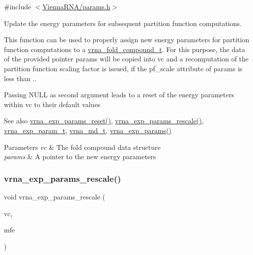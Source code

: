 {\ttfamily \#include $<$\mbox{\hyperlink{params_8h}{Vienna\+R\+N\+A/params.\+h}}$>$}



Update the energy parameters for subsequent partition function computations. 

This function can be used to properly assign new energy parameters for partition function computations to a \mbox{\hyperlink{group__fold__compound_ga1b0cef17fd40466cef5968eaeeff6166}{vrna\+\_\+fold\+\_\+compound\+\_\+t}}. For this purpose, the data of the provided pointer {\ttfamily params} will be copied into {\ttfamily vc} and a recomputation of the partition function scaling factor is issued, if the {\ttfamily pf\+\_\+scale} attribute of {\ttfamily params} is less than {.}.

Passing N\+U\+LL as second argument leads to a reset of the energy parameters within vc to their default values

\begin{DoxySeeAlso}{See also}
\mbox{\hyperlink{group__energy__parameters_gaa5409218068be84d7b50c78fbdaa85a9}{vrna\+\_\+exp\+\_\+params\+\_\+reset()}}, \mbox{\hyperlink{group__energy__parameters_gad607bc3a5b5da16400e2ca4ea5560233}{vrna\+\_\+exp\+\_\+params\+\_\+rescale()}}, \mbox{\hyperlink{group__energy__parameters_ga01d8b92fe734df8d79a6169482c7d8d8}{vrna\+\_\+exp\+\_\+param\+\_\+t}}, \mbox{\hyperlink{group__model__details_ga1f8a10e12a0a1915f2a4eff0b28ea17c}{vrna\+\_\+md\+\_\+t}}, \mbox{\hyperlink{group__energy__parameters_gab1f3016f96aa96bff020cdd904605afa}{vrna\+\_\+exp\+\_\+params()}}
\end{DoxySeeAlso}

\begin{DoxyParams}{Parameters}
{\em vc} & The fold compound data structure \\
\hline
{\em params} & A pointer to the new energy parameters \\
\hline
\end{DoxyParams}
\mbox{\label{group__energy__parameters_gad607bc3a5b5da16400e2ca4ea5560233}} 
\subsubsection{\texorpdfstring{vrna\+\_\+exp\+\_\+params\+\_\+rescale()}{vrna\_exp\_params\_rescale()}}
{\footnotesize\ttfamily void vrna\+\_\+exp\+\_\+params\+\_\+rescale (\begin{DoxyParamCaption}\item[{\mbox{\hyperlink{group__fold__compound_ga1b0cef17fd40466cef5968eaeeff6166}{vrna\+\_\+fold\+\_\+compound\+\_\+t}} $\ast$}]{vc,  }\item[{double $\ast$}]{mfe }\end{DoxyParamCaption})}



